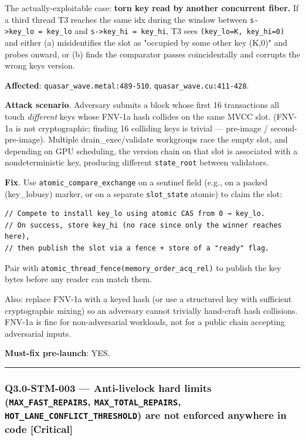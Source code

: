 \documentclass[
]{article}
\begin{document}
The actually-exploitable case: \textbf{torn key read by another
concurrent fiber.} If a third thread T3 reaches the same idx during the
window between \texttt{s-\textgreater{}key\_lo\ =\ key\_lo} and
\texttt{s-\textgreater{}key\_hi\ =\ key\_hi}, T3 sees
\texttt{(key\_lo=K,\ key\_hi=0)} and either (a) misidentifies the slot
as "occupied by some other key (K,0)" and probes onward, or (b) finds
the comparator passes coincidentally and corrupts the wrong
key\textquotesingle s version.

\textbf{Affected}: \texttt{quasar\_wave.metal:489-510},
\texttt{quasar\_wave.cu:411-428}.

\textbf{Attack scenario}. Adversary submits a block whose first 16
transactions all touch \emph{different} keys whose FNV-1a hash collides
on the same MVCC slot. (FNV-1a is not cryptographic; finding 16
colliding keys is trivial --- pre-image / second-pre-image). Multiple
drain\_exec/validate workgroups race the empty slot, and depending on
GPU scheduling, the version chain on that slot is associated with a
nondeterministic key, producing different \texttt{state\_root} between
validators.

\textbf{Fix}. Use \texttt{atomic\_compare\_exchange} on a sentinel field
(e.g., on a packed (key\_lo\textbar busy) marker, or on a separate
\texttt{slot\_state} atomic) to claim the slot:

\begin{verbatim}
// Compete to install key_lo using atomic CAS from 0 → key_lo.
// On success, store key_hi (no race since only the winner reaches here),
// then publish the slot via a fence + store of a "ready" flag.
\end{verbatim}

Pair with \texttt{atomic\_thread\_fence(memory\_order\_acq\_rel)} to
publish the key bytes before any reader can match them.

Also: replace FNV-1a with a keyed hash (or use a structured key with
sufficient cryptographic mixing) so an adversary cannot trivially
hand-craft hash collisions. FNV-1a is fine for non-adversarial
workloads, not for a public chain accepting adversarial inputs.

\textbf{Must-fix pre-launch}: YES.

\begin{center}\rule{0.5\linewidth}{0.5pt}\end{center}

\subsubsection{\texorpdfstring{Q3.0-STM-003 --- Anti-livelock hard
limits (\texttt{MAX\_FAST\_REPAIRS}, \texttt{MAX\_TOTAL\_REPAIRS},
\texttt{HOT\_LANE\_CONFLICT\_THRESHOLD}) are not enforced anywhere in
code
{[}Critical{]}}{Q3.0-STM-003 --- Anti-livelock hard limits (MAX\_FAST\_REPAIRS, MAX\_TOTAL\_REPAIRS, HOT\_LANE\_CONFLICT\_THRESHOLD) are not enforced anywhere in code {[}Critical{]}}}\label{q30-stm-003--anti-livelock-hard-limits-max_fast_repairs-max_total_repairs-hot_lane_conflict_threshold-are-not-enforced-anywhere-in-code-critical}
\end{document}
